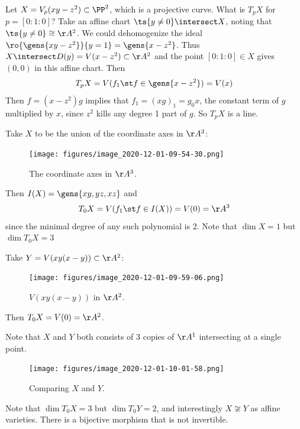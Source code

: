 \begin{example}[?]

Let \(X = V_p(xy-z^2) \subset \PP^2\), which is a projective curve. What
is \(T_p X\) for \(p = [0:1:0]\)? Take an affine chart
\(\ts{y\neq 0} \intersect X\), noting that \(\ts{y\neq 0} \cong \AA^2\).
We could dehomogenize the ideal
\(\ro{\gens{xy-z^2}}{y=1} = \gens{x-z^2}\). Thus
\(X \intersect D(y) = V(x-z^2) \subset \AA^2\) and the point
\([0:1:0] \in X\) gives \((0, 0)\) in this affine chart. Then
\begin{align*}
T_p X = V(f_1 \st f\in \gens{x-z^2}) = V(x)
\end{align*} Then \(f = (x-z^2)g\) implies that
\(f_1 = (xg)_1 = g_0 x\), the constant term of \(g\) multiplied by
\(x\), since \(z^2\) kills any degree 1 part of \(g\). So \(T_p X\) is a
line.

\end{example}

\begin{example}[?]

Take \(X\) to be the union of the coordinate axes in \(\AA^3\):

\begin{figure}
\centering
\texttt{[image: figures/image\_2020-12-01-09-54-30.png]}
\caption{The coordinate axes in \(\AA^3\).}
\end{figure}

Then \(I(X) = \gens{xy, yz, xz}\) and
\begin{align*}
T_0 X = V(f_1 \st f\in I(X)) = V(0) = \AA^3
\end{align*} since the minimal degree of any such polynomial is 2. Note
that \(\dim X = 1\) but \(\dim T_0 X = 3\)

\end{example}

\begin{example}[?]

Take \(Y = V(xy(x-y)) \subset \AA^2\):

\begin{figure}
\centering
\texttt{[image: figures/image\_2020-12-01-09-59-06.png]}
\caption{\(V(xy(x-y))\) in \(\AA^2\).}
\end{figure}

Then \(T_0 X = V(0) = \AA^2\).

\end{example}

\begin{remark}

Note that \(X\) and \(Y\) both consists of 3 copies of \(\AA^1\)
intersecting at a single point.

\begin{figure}
\centering
\texttt{[image: figures/image\_2020-12-01-10-01-58.png]}
\caption{Comparing \(X\) and \(Y\).}
\end{figure}

Note that \(\dim T_0 X = 3\) but \(\dim T_0 Y = 2\), and interestingly
\(X\not\cong Y\) as affine varieties. There is a bijective morphism that
is not invertible.

\end{remark}

